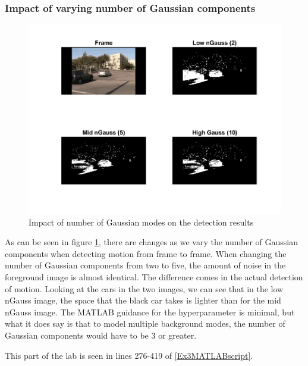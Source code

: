 \documentclass[11pt, letterpaper]{article}
\begin{document}
\subsubsection*{Impact of varying number of Gaussian components}
\begin{figure}[ht]
    \centering
    \includegraphics[width=0.75\linewidth]{Lab 3/CompareNGauss.png}
    \caption{Impact of number of Gaussian modes on the detection results}
    \label{fig:CompareNGauss}
\end{figure}

As can be seen in figure \ref{fig:CompareNGauss}, there are changes as we vary the number of Gaussian components when detecting motion from frame to frame. When changing the number of Gaussian components from two to five, the amount of noise in the foreground image is almost identical. The difference comes in the actual detection of motion. Looking at the cars in the two images, we can see that in the low nGauss image, the space that the black car takes is lighter than for the mid nGauss image. The MATLAB guidance \cite{MATLABGaussianMixtures} for the hyperparameter is minimal, but what it does say is that to model multiple background modes, the number of Gaussian components would have to be 3 or greater.

This part of the lab is seen in lines 276-419 of \ref{Ex3MATLABscript}.
\end{document}
